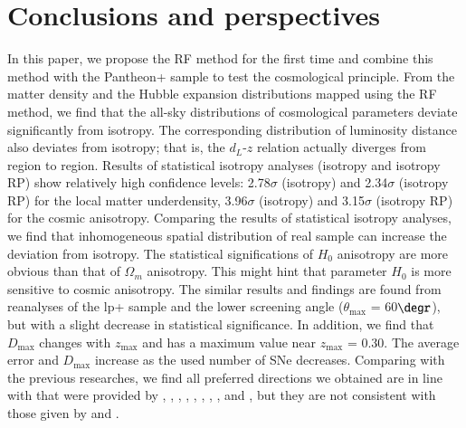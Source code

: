 \documentclass{aa}
\def\tm{$\theta_\mathrm{max}$ }
\begin{document}
\section{Conclusions and perspectives}
In this paper, we propose the RF method for the first time and combine this method with the Pantheon+ sample to test the cosmological principle. From the matter density and the Hubble expansion distributions mapped using the RF method, we find that the all-sky distributions of cosmological parameters deviate significantly from isotropy. The corresponding distribution of luminosity distance also deviates from isotropy; that is, the $d_{L}$-$z$ relation actually diverges from region to region. Results of statistical isotropy analyses (isotropy and isotropy RP) show relatively high confidence levels: 2.78$\sigma$ (isotropy) and 2.34$\sigma$ (isotropy RP) for the local matter underdensity, 3.96$\sigma$ (isotropy) and 3.15$\sigma$ (isotropy RP) for the cosmic anisotropy. Comparing the results of statistical isotropy analyses, we find that inhomogeneous spatial distribution of real sample can increase the deviation from isotropy. The statistical significations of $H_{0}$ anisotropy are more obvious than that of $\Omega_{m}$ anisotropy. This might hint that parameter $H_{0}$ is more sensitive to cosmic anisotropy. The similar results and findings are found from reanalyses of the lp+ sample and the lower screening angle (\tm = 60$\degr$), but with a slight decrease in statistical significance. In addition, we find that $D_\mathrm{max}$ changes with $z_\mathrm{max}$ and has a maximum value near $z_\mathrm{max}$ = 0.30. The average error and $D_\mathrm{max}$ increase as the used number of SNe decreases. Comparing with the previous researches, we find all preferred directions we obtained are in line with that were provided by \citet{2010JCAP...12..012A}, \citet{2012JCAP...02..004C}, \citet{2014MNRAS.443.1680W}, \citet{2014MNRAS.437.1840Y}, \citet{2013AA...553A..56K}, \citet{2015MNRAS.446.2952C}, \citet{2016MNRAS.456.1881L}, \citet{2019MNRAS.486.1658C}, and \citet{2020A&A...643A..93H}, but they are not consistent with those given by \citet{2022PhRvD.105j3510L} and \citet{2023arXiv230402718M}.
\end{document}
